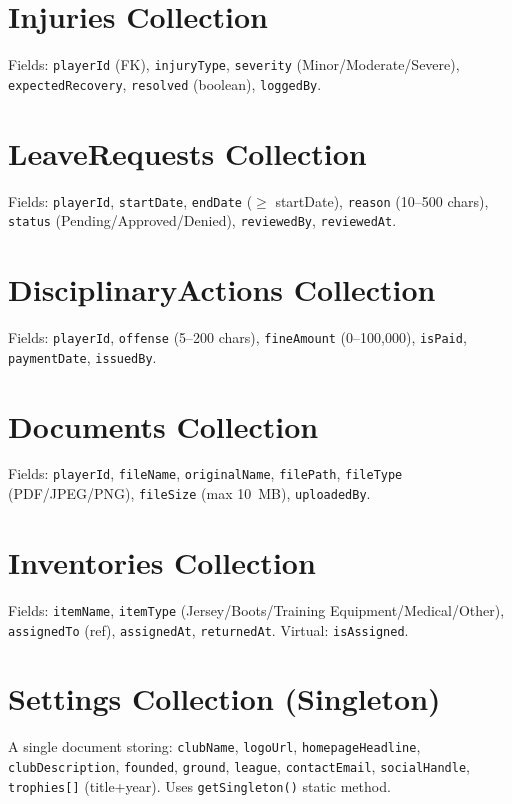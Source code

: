 \documentclass[12pt,a4paper,oneside]{report}
\begin{document}
\section{Injuries Collection}

Fields: \texttt{playerId} (FK), \texttt{injuryType}, \texttt{severity} (Minor/Moderate/Severe), \texttt{expectedRecovery}, \texttt{resolved} (boolean), \texttt{loggedBy}.

\section{LeaveRequests Collection}

Fields: \texttt{playerId}, \texttt{startDate}, \texttt{endDate} ($\geq$ startDate), \texttt{reason} (10--500 chars), \texttt{status} (Pending/Approved/Denied), \texttt{reviewedBy}, \texttt{reviewedAt}.

\section{DisciplinaryActions Collection}

Fields: \texttt{playerId}, \texttt{offense} (5--200 chars), \texttt{fineAmount} (0--100,000), \texttt{isPaid}, \texttt{paymentDate}, \texttt{issuedBy}.

\section{Documents Collection}

Fields: \texttt{playerId}, \texttt{fileName}, \texttt{originalName}, \texttt{filePath}, \texttt{fileType} (PDF/JPEG/PNG), \texttt{fileSize} (max 10~MB), \texttt{uploadedBy}.

\section{Inventories Collection}

Fields: \texttt{itemName}, \texttt{itemType} (Jersey/Boots/Training Equipment/Medical/Other), \texttt{assignedTo} (ref), \texttt{assignedAt}, \texttt{returnedAt}. Virtual: \texttt{isAssigned}.

\section{Settings Collection (Singleton)}

A single document storing: \texttt{clubName}, \texttt{logoUrl}, \texttt{homepageHeadline}, \texttt{clubDescription}, \texttt{founded}, \texttt{ground}, \texttt{league}, \texttt{contactEmail}, \texttt{socialHandle}, \texttt{trophies[]} (title+year). Uses \texttt{getSingleton()} static method.
\end{document}
